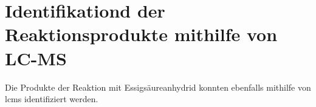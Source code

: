 \section{Identifikationd der Reaktionsprodukte mithilfe von LC-MS}

Die Produkte der Reaktion mit Essigsäureanhydrid konnten ebenfalls mithilfe von \gls{lcms} identifiziert werden.